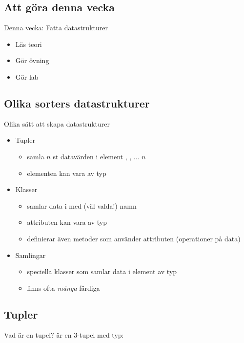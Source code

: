 
\subsection{Att göra denna vecka}
\begin{Slide}{Denna vecka: Fatta datastrukturer}
\begin{itemize}
\item Läs teori
\item Gör övning 
\item Gör lab 
\end{itemize}
\end{Slide}

\subsection{Olika sorters datastrukturer}

\begin{Slide}{Olika sätt att skapa datastrukturer}
\begin{itemize}
\item Tupler
  \begin{itemize}
  \item samla $n$ st datavärden i element , , ...  \code{_}$n$
  \item elementen kan vara av  typ
  \end{itemize}
\item Klasser   
  \begin{itemize}
  \item samlar data i  med (väl valda!) namn
  \item attributen kan vara av  typ
  \item definierar även metoder som använder attributen (operationer på data)
  \end{itemize}

\item Samlingar 
  \begin{itemize}
  \item speciella klasser som samlar data i element av  typ
  \item finns ofta \emph{många} färdiga  
  \end{itemize}
\end{itemize}
\end{Slide}

\subsection{Tupler}

\begin{Slide}{Vad är en tupel?}
 är en 3-tupel med typ: 
\end{Slide}




